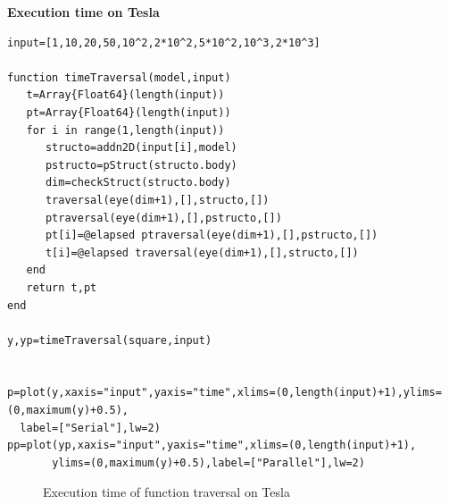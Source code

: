 \documentclass[a4paper,12pt]{article}
\begin{document}
\noindent\textbf{Execution time on Tesla}
\begin{Verbatim}[fontsize=\footnotesize]
input=[1,10,20,50,10^2,2*10^2,5*10^2,10^3,2*10^3]

function timeTraversal(model,input)
   t=Array{Float64}(length(input))
   pt=Array{Float64}(length(input))
   for i in range(1,length(input))
      structo=addn2D(input[i],model)
      pstructo=pStruct(structo.body)
      dim=checkStruct(structo.body)
      traversal(eye(dim+1),[],structo,[])
      ptraversal(eye(dim+1),[],pstructo,[])
      pt[i]=@elapsed ptraversal(eye(dim+1),[],pstructo,[])
      t[i]=@elapsed traversal(eye(dim+1),[],structo,[])
   end
   return t,pt
end

y,yp=timeTraversal(square,input)


p=plot(y,xaxis="input",yaxis="time",xlims=(0,length(input)+1),ylims=(0,maximum(y)+0.5),
  label=["Serial"],lw=2)  
pp=plot(yp,xaxis="input",yaxis="time",xlims=(0,length(input)+1),
       ylims=(0,maximum(y)+0.5),label=["Parallel"],lw=2)
\end{Verbatim}
\begin{figure}[!h]
\centering
{}
\caption{Execution time of function traversal on Tesla}
\end{figure}
\end{document}
